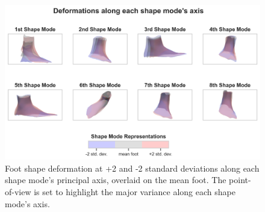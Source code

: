 \documentclass[preprint]{elsarticle}
\begin{document}
\newpage

\begin{figure}
\hypertarget{fig:pca_overlay}{%
\centering
\includegraphics[width=1\textwidth,height=\textheight]{fig/PCVAR.png}
\caption{Foot shape deformation at +2 and -2 standard deviations along each shape mode's principal axis, overlaid on the mean foot. The point-of-view is set to highlight the major variance along each shape mode's axis.}\label{fig:pca_overlay}
}
\end{figure}



\end{document}
